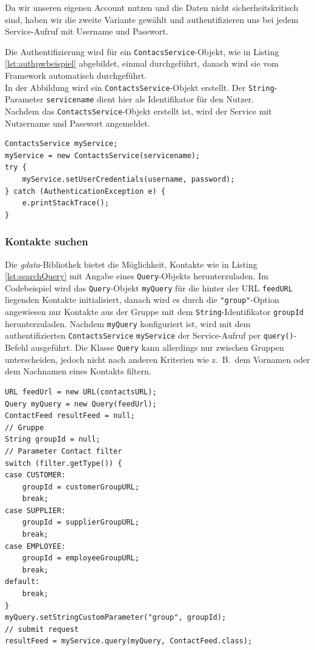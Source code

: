 Da wir unseren eigenen Account nutzen und die Daten nicht sicherheitskritisch sind, haben
 wir die zweite Variante gew\"ahlt und authentifizieren uns bei jedem Service-Aufruf mit
 Username und Passwort.

Die Authentifizierung wird für ein \lstinline{ContacsService}-Objekt, wie in Listing
 \ref{lst:authpwbeispiel} abgebildet, einmal durchgeführt, danach wird sie vom Framework
 automatisch durchgeführt.
 \\
In der Abbildung wird ein \lstinline{ContactsService}-Objekt erstellt.
Der \lstinline{String}-Parameter \lstinline{servicename} dient hier als Identifikator für den Nutzer.
\\
Nachdem das \lstinline{ContactsService}-Objekt erstellt ist, wird der Service mit Nutzername und
 Passwort angemeldet.
 
\begin{lstlisting}[float=h!t]
ContactsService myService;
myService = new ContactsService(servicename);
try {
	myService.setUserCredentials(username, password);
} catch (AuthenticationException e) {
	e.printStackTrace();
}
\end{lstlisting}

\FloatBarrier
\subsubsection{Kontakte suchen}
Die \emph{gdata}-Bibliothek bietet die Möglichkeit, Kontakte wie in Listing \ref{lst:searchQuery}
 mit Angabe eines \lstinline{Query}-Objekts herunterzuladen.
Im Codebeispiel wird das \lstinline{Query}-Objekt \lstinline{myQuery} für die hinter der URL
 \lstinline{feedURL} liegenden Kontakte initialisiert, danach wird es durch die
 \lstinline{"group"}-Option angewiesen nur Kontakte aus der Gruppe mit dem
 \lstinline{String}-Identifikator \lstinline{groupId} herunterzuladen.
Nachdem \lstinline{myQuery} konfiguriert ist, wird mit dem authentifizierten
 \lstinline{ContactsService} \lstinline{myService} der Service-Aufruf per
 \lstinline{query()}-Befehl ausgeführt.
Die Klasse \lstinline{Query} kann allerdings nur zwischen Gruppen unterscheiden, jedoch nicht nach
 anderen Kriterien wie z.\ B.\ dem Vornamen oder dem Nachnamen eines Kontakts filtern.

\begin{lstlisting}[float=h!t]
URL feedUrl = new URL(contactsURL);
Query myQuery = new Query(feedUrl);
ContactFeed resultFeed = null;
// Gruppe
String groupId = null;
// Parameter Contact filter
switch (filter.getType()) {
case CUSTOMER:
	groupId = customerGroupURL;
	break;
case SUPPLIER:
	groupId = supplierGroupURL;
	break;
case EMPLOYEE:
	groupId = employeeGroupURL;
	break;
default:
	break;
}
myQuery.setStringCustomParameter("group", groupId);
// submit request
resultFeed = myService.query(myQuery, ContactFeed.class);
\end{lstlisting}

